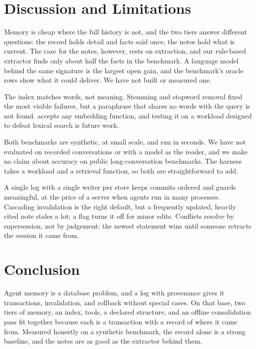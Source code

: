 \section{Discussion and Limitations}
\label{sec:discussion}

Memory is cheap where the full history is not, and the two tiers answer different
questions: the record holds detail and facts said once, the notes hold what is
current. The case for the notes, however, rests on extraction, and our rule-based
extractor finds only about half the facts in the benchmark. A language model behind
the same signature is the largest open gain, and the benchmark's oracle rows show
what it could deliver. We have not built or measured one.

The index matches words, not meaning. Stemming and stopword removal fixed the most
visible failures, but a paraphrase that shares no words with the query is not found.
\sys accepts any embedding function, and testing it on a workload designed to defeat
lexical search is future work.

Both benchmarks are synthetic, at small scale, and run in seconds. We have not
evaluated on recorded conversations or with a model as the reader, and we make no
claim about accuracy on public long-conversation benchmarks. The harness takes a
workload and a retrieval function, so both are straightforward to add.

A single log with a single writer per store keeps commits ordered and guards
meaningful, at the price of a server when agents run in many processes. Cascading
invalidation is the right default, but a frequently updated, heavily cited note
stales a lot; a flag turns it off for minor edits. Conflicts resolve by supersession,
not by judgement: the newest statement wins until someone retracts the session it came
from.

\section{Conclusion}
\label{sec:conclusion}

Agent memory is a database problem, and a log with provenance gives it transactions,
invalidation, and rollback without special cases. On that base, two tiers of memory, an
index, tools, a declared structure, and an offline consolidation pass fit together
because each is a transaction with a record of where it came from. Measured honestly
on a synthetic benchmark, the record alone is a strong baseline, and the notes are as
good as the extractor behind them.
